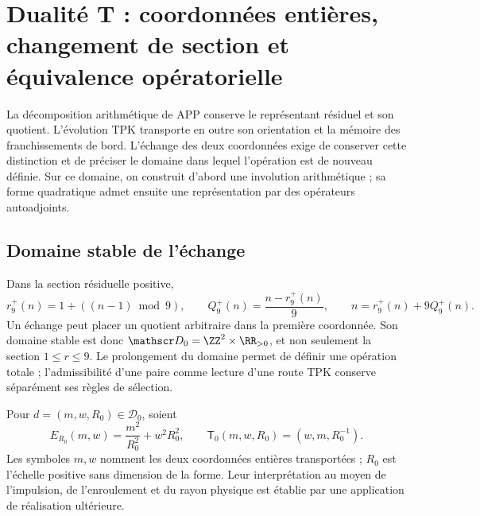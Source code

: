 \section{Dualité T : coordonnées entières, changement de section et équivalence opératorielle}
\label{iv:iv:dualidad}

La décomposition arithmétique de APP conserve le représentant résiduel
et son quotient. L’évolution TPK transporte en outre son orientation et
la mémoire des franchissements de bord. L’échange des deux
coordonnées exige de conserver cette distinction et de préciser le domaine
dans lequel l’opération est de nouveau définie. Sur ce domaine, on
construit d’abord une involution arithmétique ; sa forme quadratique
admet ensuite une représentation par des opérateurs autoadjoints.

\subsection{Domaine stable de l’échange}

Dans la section résiduelle positive,
\begin{equation}
 r_9^+(n)=1+((n-1)\bmod9),\qquad
 Q_9^+(n)=\frac{n-r_9^+(n)}9,
 \qquad n=r_9^+(n)+9Q_9^+(n).
 \label{iv:iv:eq:division-positiva}
\end{equation}
Un échange peut placer un quotient arbitraire dans la première
coordonnée. Son domaine stable est donc
\(\mathscr D_0=\ZZ^2\times\RR_{>0}\), et non seulement la section
\(1\leq r\leq9\). Le prolongement du domaine permet de définir
une opération totale ; l’admissibilité d’une paire comme lecture d’une
route TPK conserve séparément ses règles de sélection.

\begin{definition}
\label{iv:iv:def:dualidad}
Pour \(d=(m,w,R_0)\in\mathscr D_0\), soient
\begin{equation}
 E_{R_0}(m,w)=\frac{m^2}{R_0^2}+w^2R_0^2,
 \qquad
 \mathsf T_0(m,w,R_0)=(w,m,R_0^{-1}).
 \label{iv:iv:eq:energia-t}
\end{equation}
Les symboles \(m,w\) nomment les deux coordonnées entières
transportées ; \(R_0\) est l’échelle positive sans dimension de
la forme. Leur interprétation au moyen de l’impulsion, de l’enroulement et du
rayon physique est établie par une application de réalisation ultérieure.
\end{definition}

